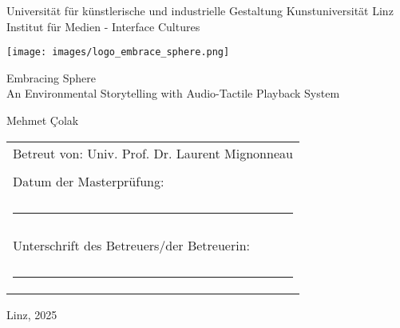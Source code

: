 \begin{titlepage}
    \centering

    {\large
    Universität für künstlerische und industrielle Gestaltung Kunstuniversität Linz\\
    Institut für Medien - Interface Cultures}
        
        \vspace{0.5cm}

        \texttt{[image: images/logo\_embrace\_sphere.png]}
        
        {\Huge Embracing Sphere\\[0.5cm]
        \Large An Environmental Storytelling with Audio-Tactile Playback System}

        \vspace{0.5cm}

        {\LARGE Mehmet Çolak}

        \vfill

        \begin{tabular}{l}
            \Large Betreut von: Univ. Prof. Dr. Laurent Mignonneau \\ \\
            \large Datum der Masterprüfung: \\ \\
            \rule{7cm}{0.1pt} \\ \\
            \large Unterschrift des Betreuers/der Betreuerin: \\ \\
            \rule{7cm}{0.1pt} \\
        \end{tabular}
        
        \vspace{1cm}
        
        {\small Linz, 2025}

\end{titlepage}